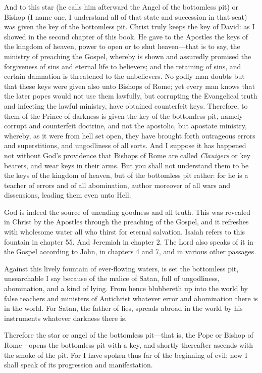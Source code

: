 And to this star (he calls him afterward the Angel of the bottomless pit) or Bishop (I name one, I understand all of that state and succession in that seat) was given the key of the bottomless pit. Christ truly keeps the key of David: as I showed in the second chapter of this book. He gave to the Apostles the keys of the kingdom of heaven, power to open or to shut heaven—that is to say, the ministry of preaching the Gospel, whereby is shown and assuredly promised the forgiveness of sins and eternal life to believers; and the retaining of sins, and certain damnation is threatened to the unbelievers. No godly man doubts but that these keys were given also unto Bishops of Rome; yet every man knows that the later popes would not use them lawfully, but corrupting the Evangelical truth and infecting the lawful ministry, have obtained counterfeit keys. Therefore, to them of the Prince of darkness is given the key of the bottomless pit, namely corrupt and counterfeit doctrine, and not the apostolic, but apostate ministry, whereby, as it were from hell set open, they have brought forth outrageous errors and superstitions, and ungodliness of all sorts. And I suppose it has happened not without God’s providence that Bishops of Rome are called \textit{Clauigers} or key bearers, and wear keys in their arms. But you shall not understand them to be the keys of the kingdom of heaven, but of the bottomless pit rather: for he is a teacher of errors and of all abomination, author moreover of all wars and dissensions, leading them even unto Hell.

God is indeed the source of unending goodness and all truth. This was revealed in Christ by the Apostles through the preaching of the Gospel, and it refreshes with wholesome water all who thirst for eternal salvation. Isaiah refers to this fountain in chapter 55. And Jeremiah in chapter 2. The Lord also speaks of it in the Gospel according to John, in chapters 4 and 7, and in various other passages.

Against this lively fountain of ever-flowing waters, is set the bottomless pit, unsearchable I say because of the malice of Satan, full of ungodliness, abomination, and a kind of lying. From hence blubbereth up into the world by false teachers and ministers of Antichrist whatever error and abomination there is in the world. For Satan, the father of lies, spreads abroad in the world by his instruments whatever darkness there is.

Therefore the star or angel of the bottomless pit—that is, the Pope or Bishop of Rome—opens the bottomless pit with a key, and shortly thereafter ascends with the smoke of the pit. For I have spoken thus far of the beginning of evil; now I shall speak of its progression and manifestation.

